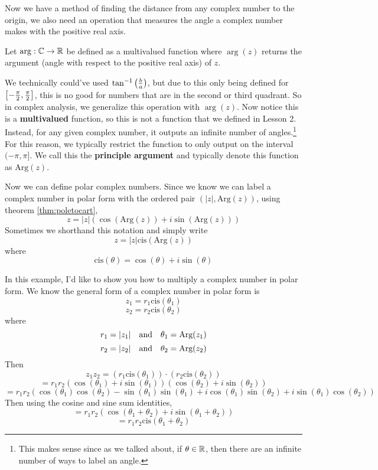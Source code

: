 Now we have a method of finding the distance from any complex number to the origin, we also need an operation that measures the angle a complex number makes with the positive real axis.
\begin{define}
	Let $\arg: \mathbb{C} \to \mathbb{R}$ be defined as a multivalued function where $\arg(z)$ returns the argument (angle with respect to the positive real axis) of $z$.
\end{define}

We technically could've used $\tan^{-1}\left(\frac{b}{a}\right)$, but due to this only being defined for $\left[-\frac{\pi}{2},\frac{\pi}{2}\right]$, this is no good for numbers that are in the second or third quadrant. So in complex analysis, we generalize this operation with $\arg(z)$. Now notice this is a \textbf{multivalued} function, so this is not a function that we defined in Lesson 2. Instead, for any given complex number, it outputs an infinite number of angles.\footnote{
This makes sense since as we talked about, if $\theta\in\mathbb{R}$, then there are an infinite number of ways to label an angle.}
For this reason, we typically restrict the function to only output on the interval $(-\pi,\pi]$. We call this the \textbf{principle argument} and typically denote this function as $\text{Arg}(z)$.

Now we can define polar complex numbers. Since we know we can label a complex number in polar form with the ordered pair $(|z|,\text{Arg}(z))$, using theorem \eqref{thm:poletocart},
$$z=|z|(\cos(\text{Arg}(z))+i\sin(\text{Arg}(z)))$$
Sometimes we shorthand this notation and simply write
$$z=|z|\text{cis}(\text{Arg}(z))$$
where
$$\text{cis}(\theta)=\cos(\theta)+i\sin(\theta)$$

\begin{ex}
	In this example, I'd like to show you how to multiply a complex number in polar form. We know the general form of a complex number in polar form is
	$$z_1=r_1\text{cis}(\theta_1)$$
	$$z_2=r_2\text{cis}(\theta_2)$$
	where
	$$r_1=|z_1| \quad\text{and}\quad \theta_1=\text{Arg}(z_1)$$
	$$r_2=|z_2| \quad\text{and}\quad \theta_2=\text{Arg}(z_2)$$
	Then
	$$z_1z_2=(r_1\text{cis}(\theta_1)) \cdot (r_2\text{cis}(\theta_2))$$
	$$=r_1r_2(\cos(\theta_1)+i\sin(\theta_1))(\cos(\theta_2)+i\sin(\theta_2))$$
	$$=r_1r_2(\cos(\theta_1)\cos(\theta_2)-\sin(\theta_1)\sin(\theta_1)+i\cos(\theta_1)\sin(\theta_2)+i\sin(\theta_1)\cos(\theta_2))$$
	Then using the cosine and sine sum identities,
	$$=r_1r_2(\cos(\theta_1+\theta_2)+i\sin(\theta_1+\theta_2))$$
	$$=r_1r_2\text{cis}(\theta_1+\theta_2)$$
\end{ex}

